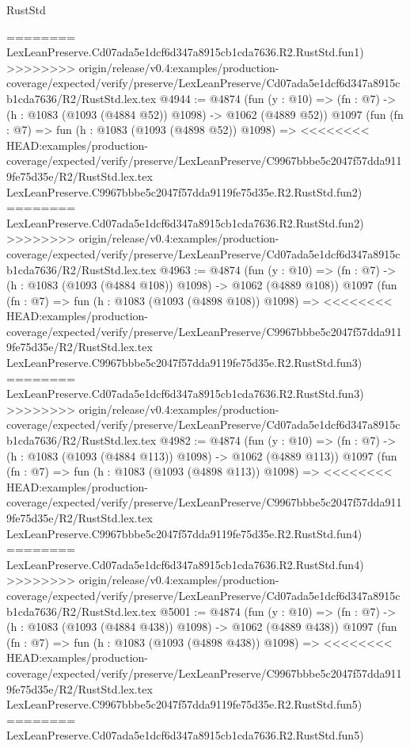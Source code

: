 \begin{lexlean}{RustStd}
\begin{coremodule}
{\begin{coremodule}
{{{{{{{{{{========
    LexLeanPreserve.Cd07ada5e1dcf6d347a8915cb1cda7636.R2.RustStd.fun1)
>>>>>>>> origin/release/v0.4:examples/production-coverage/expected/verify/preserve/LexLeanPreserve/Cd07ada5e1dcf6d347a8915cb1cda7636/R2/RustStd.lex.tex
@4944 := @4874
    (fun (y : @10) => (fn : @7) -> (h : @1083 (@1093 (@4884 @52)) @1098) -> @1062 (@4889 @52))
    @1097
    (fun (fn : @7) =>
    fun (h : @1083 (@1093 (@4898 @52)) @1098) =>
<<<<<<<< HEAD:examples/production-coverage/expected/verify/preserve/LexLeanPreserve/C9967bbbe5c2047f57dda9119fe75d35e/R2/RustStd.lex.tex
    LexLeanPreserve.C9967bbbe5c2047f57dda9119fe75d35e.R2.RustStd.fun2)
========
    LexLeanPreserve.Cd07ada5e1dcf6d347a8915cb1cda7636.R2.RustStd.fun2)
>>>>>>>> origin/release/v0.4:examples/production-coverage/expected/verify/preserve/LexLeanPreserve/Cd07ada5e1dcf6d347a8915cb1cda7636/R2/RustStd.lex.tex
@4963 := @4874
    (fun (y : @10) => (fn : @7) -> (h : @1083 (@1093 (@4884 @108)) @1098) -> @1062 (@4889 @108))
    @1097
    (fun (fn : @7) =>
    fun (h : @1083 (@1093 (@4898 @108)) @1098) =>
<<<<<<<< HEAD:examples/production-coverage/expected/verify/preserve/LexLeanPreserve/C9967bbbe5c2047f57dda9119fe75d35e/R2/RustStd.lex.tex
    LexLeanPreserve.C9967bbbe5c2047f57dda9119fe75d35e.R2.RustStd.fun3)
========
    LexLeanPreserve.Cd07ada5e1dcf6d347a8915cb1cda7636.R2.RustStd.fun3)
>>>>>>>> origin/release/v0.4:examples/production-coverage/expected/verify/preserve/LexLeanPreserve/Cd07ada5e1dcf6d347a8915cb1cda7636/R2/RustStd.lex.tex
@4982 := @4874
    (fun (y : @10) => (fn : @7) -> (h : @1083 (@1093 (@4884 @113)) @1098) -> @1062 (@4889 @113))
    @1097
    (fun (fn : @7) =>
    fun (h : @1083 (@1093 (@4898 @113)) @1098) =>
<<<<<<<< HEAD:examples/production-coverage/expected/verify/preserve/LexLeanPreserve/C9967bbbe5c2047f57dda9119fe75d35e/R2/RustStd.lex.tex
    LexLeanPreserve.C9967bbbe5c2047f57dda9119fe75d35e.R2.RustStd.fun4)
========
    LexLeanPreserve.Cd07ada5e1dcf6d347a8915cb1cda7636.R2.RustStd.fun4)
>>>>>>>> origin/release/v0.4:examples/production-coverage/expected/verify/preserve/LexLeanPreserve/Cd07ada5e1dcf6d347a8915cb1cda7636/R2/RustStd.lex.tex
@5001 := @4874
    (fun (y : @10) => (fn : @7) -> (h : @1083 (@1093 (@4884 @438)) @1098) -> @1062 (@4889 @438))
    @1097
    (fun (fn : @7) =>
    fun (h : @1083 (@1093 (@4898 @438)) @1098) =>
<<<<<<<< HEAD:examples/production-coverage/expected/verify/preserve/LexLeanPreserve/C9967bbbe5c2047f57dda9119fe75d35e/R2/RustStd.lex.tex
    LexLeanPreserve.C9967bbbe5c2047f57dda9119fe75d35e.R2.RustStd.fun5)
========
    LexLeanPreserve.Cd07ada5e1dcf6d347a8915cb1cda7636.R2.RustStd.fun5)
}}}}}}}}}}
\end{coremodule}}
\end{coremodule}
\end{lexlean}
